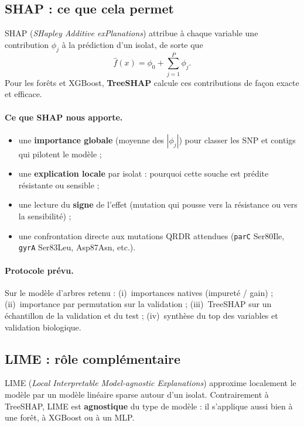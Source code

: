 \documentclass[11pt,a4paper]{article}
\begin{document}
\subsection{SHAP : ce que cela permet}

SHAP (\textit{SHapley Additive exPlanations}) \citep{lundberg2017} attribue à chaque variable une contribution \(\phi_j\) à la prédiction d'un isolat, de sorte que
\[
\hat f(x) = \phi_0 + \sum_{j=1}^{P} \phi_j.
\]
Pour les forêts et XGBoost, \textbf{TreeSHAP} calcule ces contributions de façon exacte et efficace.

\paragraph{Ce que SHAP nous apporte.}
\begin{itemize}[leftmargin=1.2em]
    \item une \textbf{importance globale} (moyenne des \(|\phi_j|\)) pour classer les SNP et contigs qui pilotent le modèle ;
    \item une \textbf{explication locale} par isolat : pourquoi cette souche est prédite résistante ou sensible ;
    \item une lecture du \textbf{signe} de l'effet (mutation qui pousse vers la résistance ou vers la sensibilité) ;
    \item une confrontation directe aux mutations QRDR attendues (\texttt{parC} Ser80Ile, \texttt{gyrA} Ser83Leu, Asp87Asn, etc.).
\end{itemize}

\paragraph{Protocole prévu.}
Sur le modèle d'arbres retenu : (i)~importances natives (impureté / gain) ; (ii)~importance par permutation sur la validation ; (iii)~TreeSHAP sur un échantillon de la validation et du test ; (iv)~synthèse du top des variables et validation biologique.

\subsection{LIME : rôle complémentaire}

LIME (\textit{Local Interpretable Model-agnostic Explanations}) \citep{ribeiro2016} approxime localement le modèle par un modèle linéaire sparse autour d'un isolat. Contrairement à TreeSHAP, LIME est \textbf{agnostique} du type de modèle : il s'applique aussi bien à une forêt, à XGBoost ou à un MLP.
\end{document}
